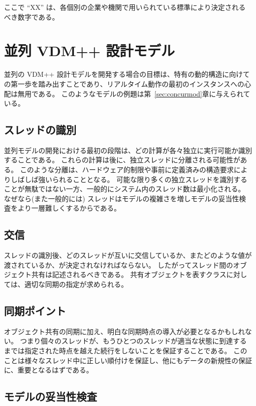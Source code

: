\documentclass[\pformat,12pt]{jreport}
\begin{document}
ここで ``XX'' は、各個別の企業や機関で用いられている標準により決定されるべき数字である。

\section{並列 VDM++ 設計モデル}\label{sec:concur}
並列の VDM++ 設計モデルを開発する場合の目標は、特有の動的構造に向けての第一歩を踏み出すことであり、リアルタイム動作の最初のインスタンスへの心配は無用である。
このようなモデルの例題は第~\ref{sec:concurmod}章に与えられている。

\subsection{スレッドの識別}

並列モデルの開発における最初の段階は、どの計算が各々独立に実行可能か識別することである。
これらの計算は後に、独立スレッドに分離される可能性がある。
このような分離は、ハードウェア的制限や事前に定義済みの構造要求によりしばしば強いられることとなる。
可能な限り多くの独立スレッドを識別することが無駄ではない一方、一般的にシステム内のスレッド数は最小化される。
なぜなら(また一般的には) スレッドはモデルの複雑さを増しモデルの妥当性検査をより一層難しくするからである。

\subsection{交信}

スレッドの識別後、どのスレッドが互いに交信しているか、またどのような値が渡されているか、が決定されなければならない。
したがってスレッド間のオブジェクト共有は記述されるべきである。
共有オブジェクトを表すクラスに対しては、適切な同期の指定が求められる。

\subsection{同期ポイント}

オブジェクト共有の同期に加え、明白な同期時点の導入が必要となるかもしれない。
つまり個々のスレッドが、もうひとつのスレッドが適当な状態に到達するまでは指定された時点を越えた続行をしないことを保証することである。
このことは様々なスレッド中に正しい順付けを保証し、他にもデータの新規性の保証に、重要となるはずである。

\subsection{モデルの妥当性検査}
\end{document}
